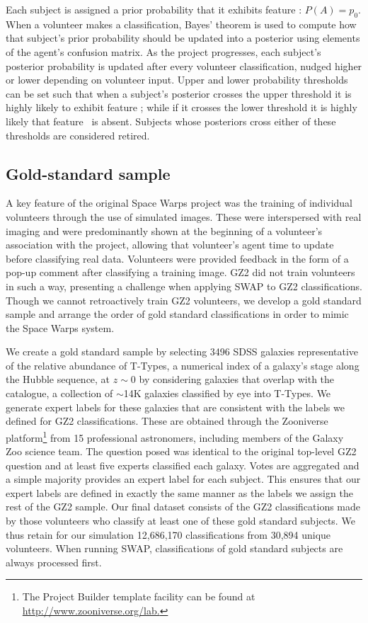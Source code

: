 Each subject is assigned a prior probability that it exhibits feature \A: $P(A) = p_0$. When a volunteer makes a classification, Bayes' theorem is used to compute how that subject's prior probability should be updated into a posterior using elements of the agent's confusion matrix. As the project progresses, each subject's posterior probability is updated after every volunteer classification, nudged higher or lower depending on volunteer input. Upper and lower probability thresholds can be set such that when a subject's posterior crosses the upper threshold it is highly likely to exhibit feature \A; while if it crosses the lower threshold it is highly likely that feature \A~is absent. Subjects whose posteriors cross either of these thresholds are considered retired.


\subsection{Gold-standard sample}\label{sec: training sample}

A key feature of the original Space Warps project was the training of individual volunteers through the use of simulated images. These were interspersed with real imaging and were predominantly shown at the beginning of a volunteer's association with the project, allowing that volunteer's agent time to update before classifying real data. Volunteers were provided feedback in the form of a pop-up comment after classifying a training image. GZ2 did not train volunteers in such a way, presenting a challenge when applying SWAP to GZ2 classifications. Though we cannot retroactively train GZ2 volunteers, we develop a gold standard sample and arrange the order of gold standard classifications in order to mimic the Space Warps system.


We create a gold standard sample by selecting 3496 SDSS galaxies representative of the relative abundance of T-Types, a numerical index of a galaxy's stage along the Hubble sequence, at $z\sim0$ by considering galaxies that overlap with the~\cite{NairAbraham2010} catalogue, a collection of $\sim$14K galaxies classified by eye into T-Types. We generate expert labels for these galaxies that are consistent with the labels we defined for GZ2 classifications. These are obtained through the Zooniverse platform\footnote{The Project Builder template facility can be found at \url{http://www.zooniverse.org/lab.}} from 15 professional astronomers, including members of the Galaxy Zoo science team.  The question posed was identical to the original top-level GZ2 question and at least five experts classified each galaxy. Votes are aggregated and a simple majority provides an expert label for each subject. This ensures that our expert labels are defined in exactly the same manner as the labels we assign the rest of the GZ2 sample. Our final dataset consists of the GZ2 classifications made by those volunteers who classify at least one of these gold standard subjects. We thus retain for our simulation 12,686,170 classifications from 30,894 unique volunteers. When running SWAP, classifications of gold standard subjects are always processed first. 

